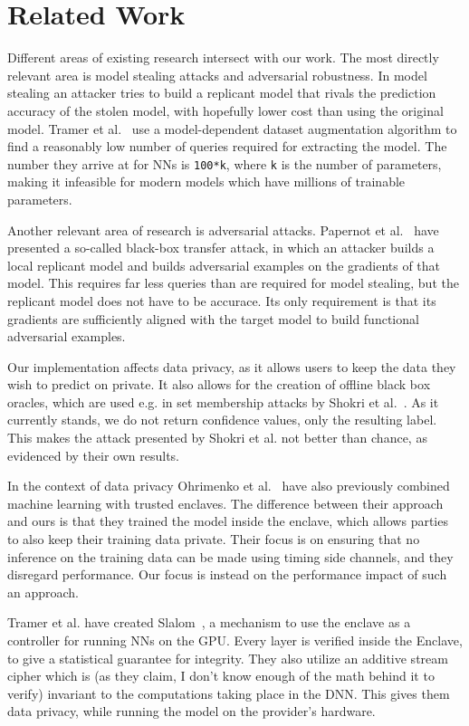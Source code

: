 \documentclass[11pt,twocolumn]{article}
\begin{document}
\section{Related Work}
\label{sec:related}

Different areas of existing research intersect with our work.
The most directly relevant area is model stealing attacks and adversarial robustness.
In model stealing an attacker tries to build a replicant model that rivals the prediction accuracy of the stolen model, with hopefully lower cost than using the original model.
Tramer et al.~\cite{tramer_stealing_2016} use a model-dependent dataset augmentation algorithm to find a reasonably low number of queries required for extracting the model.
The number they arrive at for NNs is \texttt{100*k}, where \texttt{k} is the number of parameters, making it infeasible for modern models which have millions of trainable parameters.

Another relevant area of research is adversarial attacks.
Papernot et al.~\cite{papernot_practical_2017} have presented a so-called black-box transfer attack, in which an attacker builds a local replicant model and builds adversarial examples on the gradients of that model.
This requires far less queries than are required for model stealing, but the replicant model does not have to be accurace.
Its only requirement is that its gradients are sufficiently aligned with the target model to build functional adversarial examples.

Our implementation affects data privacy, as it allows users to keep the data they wish to predict on private.
It also allows for the creation of offline black box oracles, which are used e.g. in set membership attacks by Shokri et al.~\cite{shokri_membership_2017}.
As it currently stands, we do not return confidence values, only the resulting label.
This makes the attack presented by Shokri et al. not better than chance, as evidenced by their own results.

In the context of data privacy Ohrimenko et al.~\cite{ohrimenko_oblivious_2016} have also previously combined machine learning with trusted enclaves.
The difference between their approach and ours is that they trained the model inside the enclave, which allows parties to also keep their training data private.
Their focus is on ensuring that no inference on the training data can be made using timing side channels, and they disregard performance.
Our focus is instead on the performance impact of such an approach.

Tramer et al. have created Slalom~\cite{tramer_slalom_2019}, a mechanism to use the enclave as a controller for running NNs on the GPU.
Every layer is verified inside the Enclave, to give a statistical guarantee for integrity.
They also utilize an additive stream cipher which is (as they claim, I don't know enough of the math behind it to verify) invariant to the computations taking place in the DNN.
This gives them data privacy, while running the model on the provider's hardware.
\end{document}
